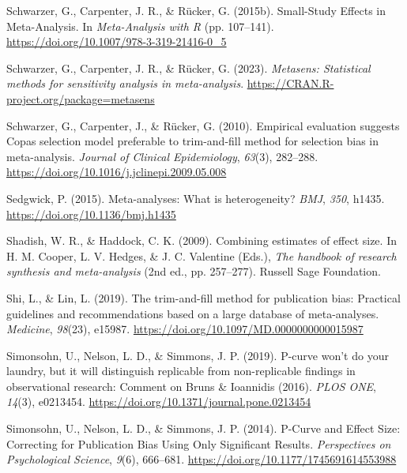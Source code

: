 \documentclass[
  bookmarksnumbered]{article}
\newlength{\cslhangindent}
\newlength{\cslentryspacingunit} %
\newenvironment{CSLReferences}[2] %
 {%
  \setlength{\parindent}{0pt}
  \ifodd #1
  \let\oldpar\par
  \def\par{\hangindent=\cslhangindent\oldpar}
  \fi
  \setlength{\parskip}{#2\cslentryspacingunit}
 }%
 {}
\begin{document}
\begin{CSLReferences}{1}{0}
\leavevmode{}%
Schwarzer, G., Carpenter, J. R., \& Rücker, G. (2015b). Small-{Study Effects} in {Meta}-{Analysis}. In \emph{Meta-{Analysis} with {R}} (pp. 107--141). \url{https://doi.org/10.1007/978-3-319-21416-0_5}

\leavevmode{}%
Schwarzer, G., Carpenter, J. R., \& Rücker, G. (2023). \emph{Metasens: Statistical methods for sensitivity analysis in meta-analysis}. \url{https://CRAN.R-project.org/package=metasens}

\leavevmode{}%
Schwarzer, G., Carpenter, J., \& Rücker, G. (2010). Empirical evaluation suggests {Copas} selection model preferable to trim-and-fill method for selection bias in meta-analysis. \emph{Journal of Clinical Epidemiology}, \emph{63}(3), 282--288. \url{https://doi.org/10.1016/j.jclinepi.2009.05.008}

\leavevmode{}%
Sedgwick, P. (2015). Meta-analyses: What is heterogeneity? \emph{BMJ}, \emph{350}, h1435. \url{https://doi.org/10.1136/bmj.h1435}

\leavevmode{}%
Shadish, W. R., \& Haddock, C. K. (2009). Combining estimates of effect size. In H. M. Cooper, L. V. Hedges, \& J. C. Valentine (Eds.), \emph{The handbook of research synthesis and meta-analysis} (2nd ed., pp. 257--277). {Russell Sage Foundation}.

\leavevmode{}%
Shi, L., \& Lin, L. (2019). The trim-and-fill method for publication bias: Practical guidelines and recommendations based on a large database of meta-analyses. \emph{Medicine}, \emph{98}(23), e15987. \url{https://doi.org/10.1097/MD.0000000000015987}

\leavevmode{}%
Simonsohn, U., Nelson, L. D., \& Simmons, J. P. (2019). P-curve won't do your laundry, but it will distinguish replicable from non-replicable findings in observational research: {Comment} on {Bruns} \& {Ioannidis} (2016). \emph{PLOS ONE}, \emph{14}(3), e0213454. \url{https://doi.org/10.1371/journal.pone.0213454}

\leavevmode{}%
Simonsohn, U., Nelson, L. D., \& Simmons, J. P. (2014). P-{Curve} and {Effect Size}: {Correcting} for {Publication Bias Using Only Significant Results}. \emph{Perspectives on Psychological Science}, \emph{9}(6), 666--681. \url{https://doi.org/10.1177/1745691614553988}


\end{CSLReferences}
\end{document}
